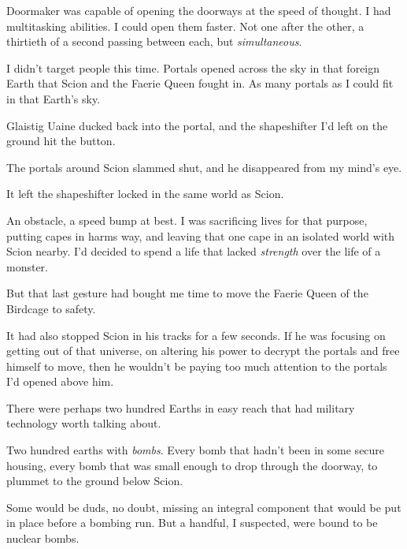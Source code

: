 Doormaker was capable of opening the doorways at the speed of thought.  I had multitasking abilities.  I could open them faster.  Not one after the other, a thirtieth of a second passing between each, but \emph{simultaneous}.



I didn't target people this time.  Portals opened across the sky in that foreign Earth that Scion and the Faerie Queen fought in.  As many portals as I could fit in that Earth's sky.



Glaistig Uaine ducked back into the portal, and the shapeshifter I'd left on the ground hit the button.



The portals around Scion slammed shut, and he disappeared from my mind's eye.



It left the shapeshifter locked in the same world as Scion.



An obstacle, a speed bump at best.  I was sacrificing lives for that purpose, putting capes in harms way, and leaving that one cape in an isolated world with Scion nearby.  I'd decided to spend a life that lacked \emph{strength} over the life of a monster.



But that last gesture had bought me time to move the Faerie Queen of the Birdcage to safety.



It had also stopped Scion in his tracks for a few seconds.  If he was focusing on getting out of that universe, on altering his power to decrypt the portals and free himself to move, then he wouldn't be paying too much attention to the portals I'd opened above him.



There were perhaps two hundred Earths in easy reach that had military technology worth talking about.



Two hundred earths with \emph{bombs}.  Every bomb that hadn't been in some secure housing, every bomb that was small enough to drop through the doorway, to plummet to the ground below Scion.



Some would be duds, no doubt, missing an integral component that would be put in place before a bombing run.  But a handful, I suspected, were bound to be nuclear bombs.



